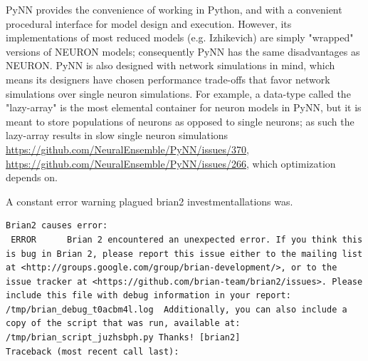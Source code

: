 PyNN provides the convenience of working in Python, and with a convenient procedural interface for model design and execution.
However, its implementations of most reduced models (e.g. Izhikevich) are simply "wrapped" versions of NEURON models; consequently PyNN has the same disadvantages as NEURON.
PyNN is also designed with network simulations in mind, which means its designers have chosen performance trade-offs that favor network simulations over single neuron simulations.
For example, a data-type called the "lazy-array" is the most elemental container for neuron models in PyNN, but it is meant to store populations of neurons as opposed to single neurons;
as such the lazy-array results in slow single neuron simulations \url{https://github.com/NeuralEnsemble/PyNN/issues/370}, \url{https://github.com/NeuralEnsemble/PyNN/issues/266}, which optimization depends on.

A constant error warning plagued brian2 investmentallations was.
\begin{verbatim}
Brian2 causes error:
 ERROR      Brian 2 encountered an unexpected error. If you think this is bug in Brian 2, please report this issue either to the mailing list at <http://groups.google.com/group/brian-development/>, or to the issue tracker at <https://github.com/brian-team/brian2/issues>. Please include this file with debug information in your report: /tmp/brian_debug_t0acbm4l.log  Additionally, you can also include a copy of the script that was run, available at: /tmp/brian_script_juzhsbph.py Thanks! [brian2]
Traceback (most recent call last):
\end{verbatim}

